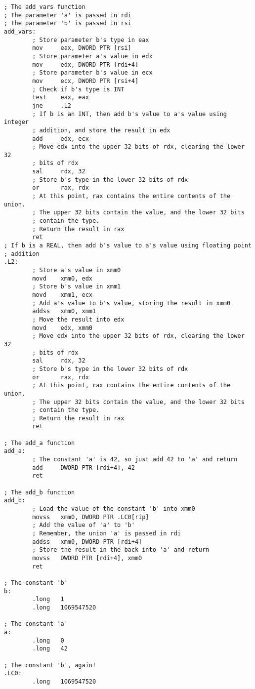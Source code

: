 \documentclass{article}
\begin{document}
\begin{lstlisting}[language={[x64]Assembler}]
; The add_vars function
; The parameter 'a' is passed in rdi
; The parameter 'b' is passed in rsi
add_vars:
        ; Store parameter b's type in eax
        mov     eax, DWORD PTR [rsi]
        ; Store parameter a's value in edx
        mov     edx, DWORD PTR [rdi+4]
        ; Store parameter b's value in ecx
        mov     ecx, DWORD PTR [rsi+4]
        ; Check if b's type is INT
        test    eax, eax
        jne     .L2
        ; If b is an INT, then add b's value to a's value using integer
        ; addition, and store the result in edx
        add     edx, ecx
        ; Move edx into the upper 32 bits of rdx, clearing the lower 32
        ; bits of rdx
        sal     rdx, 32
        ; Store b's type in the lower 32 bits of rdx
        or      rax, rdx
        ; At this point, rax contains the entire contents of the union. 
        ; The upper 32 bits contain the value, and the lower 32 bits 
        ; contain the type.
        ; Return the result in rax
        ret
; If b is a REAL, then add b's value to a's value using floating point 
; addition
.L2:
        ; Store a's value in xmm0
        movd    xmm0, edx
        ; Store b's value in xmm1
        movd    xmm1, ecx
        ; Add a's value to b's value, storing the result in xmm0
        addss   xmm0, xmm1
        ; Move the result into edx
        movd    edx, xmm0
        ; Move edx into the upper 32 bits of rdx, clearing the lower 32 
        ; bits of rdx
        sal     rdx, 32
        ; Store b's type in the lower 32 bits of rdx
        or      rax, rdx
        ; At this point, rax contains the entire contents of the union. 
        ; The upper 32 bits contain the value, and the lower 32 bits 
        ; contain the type.
        ; Return the result in rax
        ret

; The add_a function
add_a:
        ; The constant 'a' is 42, so just add 42 to 'a' and return
        add     DWORD PTR [rdi+4], 42
        ret

; The add_b function
add_b:
        ; Load the value of the constant 'b' into xmm0
        movss   xmm0, DWORD PTR .LC0[rip]
        ; Add the value of 'a' to 'b'
        ; Remember, the union 'a' is passed in rdi
        addss   xmm0, DWORD PTR [rdi+4]
        ; Store the result in the back into 'a' and return
        movss   DWORD PTR [rdi+4], xmm0
        ret

; The constant 'b'
b:
        .long   1
        .long   1069547520

; The constant 'a'
a:
        .long   0
        .long   42

; The constant 'b', again!
.LC0:
        .long   1069547520
\end{lstlisting}
\end{document}
